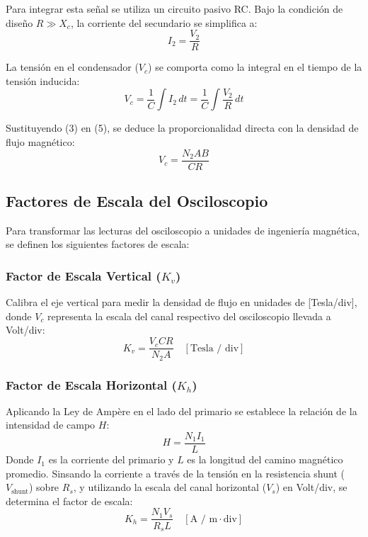 Para integrar esta señal se utiliza un circuito pasivo RC. Bajo la condición de diseño $R \gg X_c$, la corriente del secundario se simplifica a:
\begin{equation}
I_2 = \frac{V_2}{R}
\end{equation}

La tensión en el condensador ($V_c$) se comporta como la integral en el tiempo de la tensión inducida:
\begin{equation}
V_c = \frac{1}{C} \int I_2 \,dt = \frac{1}{C} \int \frac{V_2}{R} \,dt
\end{equation}

Sustituyendo (3) en (5), se deduce la proporcionalidad directa con la densidad de flujo magnético:
\begin{equation}
V_c = \frac{N_2 A B}{CR}
\end{equation}

\subsection{Factores de Escala del Osciloscopio}
Para transformar las lecturas del osciloscopio a unidades de ingeniería magnética, se definen los siguientes factores de escala:

\subsubsection{Factor de Escala Vertical ($K_v$)}
Calibra el eje vertical para medir la densidad de flujo en unidades de [Tesla/div], donde $V_c$ representa la escala del canal respectivo del osciloscopio llevada a Volt/div:
\begin{equation}
K_v = \frac{V_c CR}{N_2 A} \quad \left[\text{Tesla / div}\right]
\end{equation}

\subsubsection{Factor de Escala Horizontal ($K_h$)}
Aplicando la Ley de Ampère en el lado del primario se establece la relación de la intensidad de campo $H$:
\begin{equation}
H = \frac{N_1 I_1}{L}
\end{equation}
Donde $I_1$ es la corriente del primario y $L$ es la longitud del camino magnético promedio. Sinsando la corriente a través de la tensión en la resistencia shunt ($V_{\text{shunt}}$) sobre $R_s$, y utilizando la escala del canal horizontal ($V_s$) en Volt/div, se determina el factor de escala:
\begin{equation}
K_h = \frac{N_1 V_s}{R_s L} \quad \left[\text{A / m} \cdot \text{div}\right]
\end{equation}
